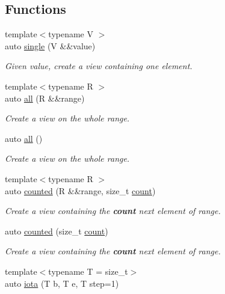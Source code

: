 \subsection*{Functions}
\begin{DoxyCompactItemize}
\item 
{\footnotesize template$<$typename V $>$ }\\auto \mbox{\hyperlink{namespacerah_1_1view_a582017379aa588d2c1c7bac58f4856af}{single}} (V \&\&value)
\begin{DoxyCompactList}\small\item\em Given value, create a view containing one element. \end{DoxyCompactList}\item 
{\footnotesize template$<$typename R $>$ }\\auto \mbox{\hyperlink{namespacerah_1_1view_a08f246d1e3e728738c48741274f5e9d7}{all}} (R \&\&range)
\begin{DoxyCompactList}\small\item\em Create a view on the whole range. \end{DoxyCompactList}\item 
auto \mbox{\hyperlink{namespacerah_1_1view_addec9cf697ca9378bb7b68ad732d9a0d}{all}} ()
\begin{DoxyCompactList}\small\item\em Create a view on the whole range. \end{DoxyCompactList}\item 
{\footnotesize template$<$typename R $>$ }\\auto \mbox{\hyperlink{namespacerah_1_1view_a3ef591f1a04b16220fb967ddea5bc1e9}{counted}} (R \&\&range, size\+\_\+t \mbox{\hyperlink{namespacerah_aa528865cc4a45d4eb276329554f16b4b}{count}})
\begin{DoxyCompactList}\small\item\em Create a view containing the {\bfseries{count}} next element of range. \end{DoxyCompactList}\item 
auto \mbox{\hyperlink{namespacerah_1_1view_af359927d911e400baa372a8cb7817aa2}{counted}} (size\+\_\+t \mbox{\hyperlink{namespacerah_aa528865cc4a45d4eb276329554f16b4b}{count}})
\begin{DoxyCompactList}\small\item\em Create a view containing the {\bfseries{count}} next element of range. \end{DoxyCompactList}\item 
{\footnotesize template$<$typename T  = size\+\_\+t$>$ }\\auto \mbox{\hyperlink{namespacerah_1_1view_aa5f05009b0c914331b0e5dbe62656b5a}{iota}} (T b, T e, T step=1)

\end{DoxyCompactItemize}
